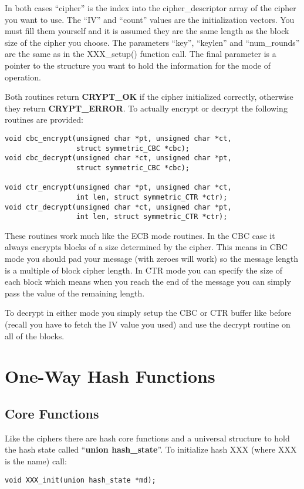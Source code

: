 \documentclass{book}
\begin{document}
In both cases ``cipher'' is the index into the cipher\_descriptor array of the cipher you want to use.  The ``IV'' and
``count'' values are the initialization vectors.  You must fill them yourself and it is assumed they are the same length
as the block size of the cipher you choose.  The parameters ``key'', ``keylen'' and ``num\_rounds'' are the same as in
the XXX\_setup() function call.  The final parameter is a pointer to the structure you want to hold the information for
the mode of operation.

Both routines return {\bf CRYPT\_OK} if the cipher initialized correctly, otherwise they return {\bf CRYPT\_ERROR}.  To 
actually encrypt or decrypt the following routines are provided:
\begin{verbatim}
void cbc_encrypt(unsigned char *pt, unsigned char *ct, 
                 struct symmetric_CBC *cbc);
void cbc_decrypt(unsigned char *ct, unsigned char *pt,
                 struct symmetric_CBC *cbc);

void ctr_encrypt(unsigned char *pt, unsigned char *ct, 
                 int len, struct symmetric_CTR *ctr);
void ctr_decrypt(unsigned char *ct, unsigned char *pt, 
                 int len, struct symmetric_CTR *ctr);
\end{verbatim}

These routines work much like the ECB mode routines.  In the CBC case it always encrypts blocks of a size determined
by the cipher.  This means in CBC mode you should pad your message (with zeroes will work) so the message length
is a multiple of block cipher length.  In CTR mode you can specify the size of each block which means when you reach
the end of the message you can simply pass the value of the remaining length.

To decrypt in either mode you simply setup the CBC or CTR buffer like before (recall you have to fetch the IV value you used)
and use the decrypt routine on all of the blocks.

\chapter{One-Way Hash Functions}
\section{Core Functions}

Like the ciphers there are hash core functions and a universal structure to hold the hash state called 
``{\bf union hash\_state}''.  To initialize hash XXX (where XXX is the name) call:
\begin{verbatim}
void XXX_init(union hash_state *md);
\end{verbatim}
\end{document}
